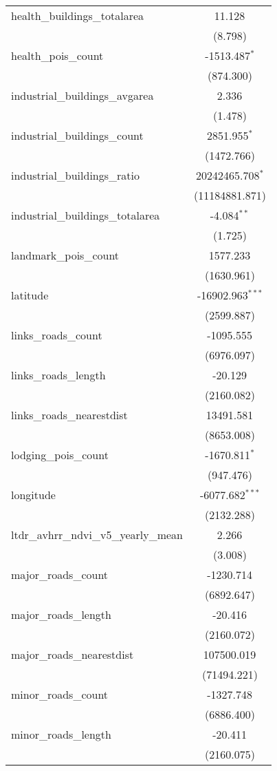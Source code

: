 \begin{table}[!htbp]
\begin{tabular}{@{\extracolsep{5pt}}lc}
 health_buildings_totalarea & 11.128$^{}$ \\
  & (8.798) \\
 health_pois_count & -1513.487$^{*}$ \\
  & (874.300) \\
 industrial_buildings_avgarea & 2.336$^{}$ \\
  & (1.478) \\
 industrial_buildings_count & 2851.955$^{*}$ \\
  & (1472.766) \\
 industrial_buildings_ratio & 20242465.708$^{*}$ \\
  & (11184881.871) \\
 industrial_buildings_totalarea & -4.084$^{**}$ \\
  & (1.725) \\
 landmark_pois_count & 1577.233$^{}$ \\
  & (1630.961) \\
 latitude & -16902.963$^{***}$ \\
  & (2599.887) \\
 links_roads_count & -1095.555$^{}$ \\
  & (6976.097) \\
 links_roads_length & -20.129$^{}$ \\
  & (2160.082) \\
 links_roads_nearestdist & 13491.581$^{}$ \\
  & (8653.008) \\
 lodging_pois_count & -1670.811$^{*}$ \\
  & (947.476) \\
 longitude & -6077.682$^{***}$ \\
  & (2132.288) \\
 ltdr_avhrr_ndvi_v5_yearly_mean & 2.266$^{}$ \\
  & (3.008) \\
 major_roads_count & -1230.714$^{}$ \\
  & (6892.647) \\
 major_roads_length & -20.416$^{}$ \\
  & (2160.072) \\
 major_roads_nearestdist & 107500.019$^{}$ \\
  & (71494.221) \\
 minor_roads_count & -1327.748$^{}$ \\
  & (6886.400) \\
 minor_roads_length & -20.411$^{}$ \\
  & (2160.075) \\

\end{tabular}
\end{table}

